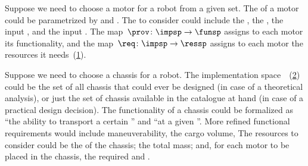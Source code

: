 \begin{example}
    \label{exa:motor}
    Suppose we need to choose a motor for a robot from a given set.
    The  of a motor could be parametrized by  and .
    The  to consider could include the \R{\unit[cost]{[USD]}}, the \R{\unit[mass]{[g]}}, the input \R{\unit[voltage]{[V]}}, and the input \R{\unit[current]{[A]}}.
    The map~$\prov \colon \impsp\to\funsp$ assigns to each motor its functionality, and the map~$\req \colon \impsp\rightarrow\ressp$ assigns to each motor the resources it needs~(\cref{fig:motor_evalexec}).
\end{example}

\begin{figure}[h]
    \centering
    \caption{}
    \label{fig:motor_evalexec}
\end{figure}

\begin{example}
    \label{exa:chassis}
    Suppose we need to choose a chassis for a robot.
    The implementation space~\impsp~(\cref{fig:gmcdp_chassis_eval}) could be the set of all chassis that could ever be designed (in case of a theoretical analysis), or just the set of chassis available in the catalogue at hand (in case of a practical design decision).
    The functionality of a chassis could be formalized as ``the ability to transport a certain '' and ``at a given ''.
    More refined functional requirements would include maneuverability, the cargo volume, \etc
    The resources to consider could be the  of the chassis; the total mass;
    and, for each motor to be placed in the chassis, the required  and .
\end{example}

\begin{figure}[h]
    \centering
    \caption{}
    \label{fig:gmcdp_chassis_eval}
\end{figure}


